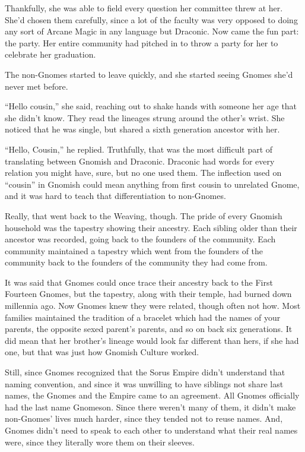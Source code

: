 \documentclass[12pt]{article}[titlepage]
\newcommand{\say}[1]{``#1''}
\renewcommand{\,}{\textsuperscript{,}}
\begin{document}
Thankfully, she was able to field every question her committee threw at her.
She'd chosen them carefully, since a lot of the faculty was very opposed to doing any sort of Arcane Magic in any language but Draconic.
Now came the fun part: the party.
Her entire community had pitched in to throw a party for her to celebrate her graduation.

The non-Gnomes started to leave quickly, and she started seeing Gnomes she'd never met before.

\say{Hello cousin,} she said, reaching out to shake hands with someone her age that she didn't know.
They read the lineages strung around the other's wrist.
She noticed that he was single, but shared a sixth generation ancestor with her.

\say{Hello, Cousin,} he replied.
Truthfully, that was the most difficult part of translating between Gnomish and Draconic.
Draconic had words for every relation you might have, sure, but no one used them.
The inflection used on \say{cousin} in Gnomish could mean anything from first cousin to unrelated Gnome, and it was hard to teach that differentiation to non-Gnomes.

Really, that went back to the Weaving, though.
The pride of every Gnomish household was the tapestry showing their ancestry.
Each sibling older than their ancestor was recorded, going back to the founders of the community.
Each community maintained a tapestry which went from the founders of the community back to the founders of the community they had come from.

It was said that Gnomes could once trace their ancestry back to the First Fourteen Gnomes, but the tapestry, along with their temple, had burned down millennia ago.
Now Gnomes knew they were related, though often not how.
Most families maintained the tradition of a bracelet which had the names of your parents, the opposite sexed parent's parents, and so on back six generations.
It did mean that her brother's lineage would look far different than hers, if she had one, but that was just how Gnomish Culture worked.

Still, since Gnomes recognized that the Sorus Empire didn't understand that naming convention, and since it was unwilling to have siblings not share last names, the Gnomes and the Empire came to an agreement.
All Gnomes officially had the last name Gnomeson.
Since there weren't many of them, it didn't make non-Gnomes' lives much harder, since they tended not to reuse names.
And, Gnomes didn't need to speak to each other to understand what their real names were, since they literally wore them on their sleeves.
\end{document}
